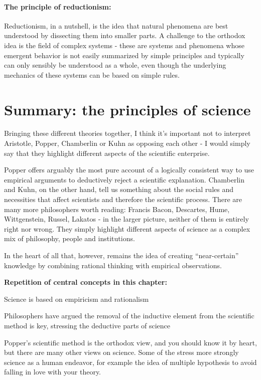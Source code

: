 \documentclass{tufte-book}
\begin{document}
\paragraph{The principle of reductionism:} Reductionism, in a nutshell, is the idea that natural phenomena are best understood by dissecting them into smaller parts. A challenge to the orthodox idea is the field of complex systems - these are systems and phenomena whose emergent behavior is not easily summarized by simple principles and typically can only sensibly be understood as a whole, even though the underlying mechanics of these systems can be based on simple rules. 


\section{Summary: the principles of science}

Bringing these different theories together, I think it's important not to interpret Aristotle, Popper, Chamberlin or Kuhn as opposing each other - I would simply say that they highlight different aspects of the scientific enterprise. 

Popper offers arguably the most pure account of a logically consistent way to use empirical arguments to deductively reject a scientific explanation. Chamberlin and Kuhn, on the other hand, tell us something about the social rules and necessities that affect scientists and therefore the scientific process. There are many more philosophers worth reading: Francis Bacon, Descartes, Hume, Wittgenstein, Russel, Lakatos - in the larger picture, neither of them is entirely right nor wrong. They simply highlight different aspects of science as a complex mix of philosophy, people and institutions. 

In the heart of all that, however, remains the idea of creating ``near-certain'' knowledge by combining rational thinking with empirical observations.

\vspace{1cm}
\begin{mdframed}[backgroundcolor=black!10,rightline=false,leftline=false]

\textbf{Repetition of central concepts in this chapter:} 

\begin{itemize*}
  \item Science is based on empiricism and rationalism
  \item Philosophers have argued the removal of the inductive element from the scientific method is key, stressing the deductive parts of science
  \item Popper's scientific method is the orthodox view, and you should know it by heart, but there are many other views on science. Some of the stress more strongly science as a human endeavor, for example the idea of multiple hypothesis to avoid falling in love with your theory. 
\end{itemize*}

\end{mdframed}
\end{document}

